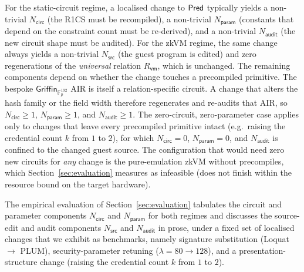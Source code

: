 For the static-circuit regime, a localised change to $\mathsf{Pred}$ typically yields a non-trivial $N_{\mathsf{circ}}$ (the R1CS must be recompiled), a non-trivial $N_{\mathsf{param}}$ (constants that depend on the constraint count must be re-derived), and a non-trivial $N_{\mathsf{audit}}$ (the new circuit shape must be audited).
For the zkVM regime, the same change always yields a non-trivial $N_{\mathsf{src}}$ (the guest program is edited) and zero regenerations of the \emph{universal} relation $R_{\mathsf{vm}}$, which is unchanged. The remaining components depend on whether the change touches a precompiled primitive. The bespoke $\mathsf{Griffin}_{\mathbb{F}_p^{192}}$ AIR is itself a relation-specific circuit. A change that alters the hash family or the field width therefore regenerates and re-audits that AIR, so $N_{\mathsf{circ}}\ge 1$, $N_{\mathsf{param}}\ge 1$, and $N_{\mathsf{audit}}\ge 1$. The zero-circuit, zero-parameter case applies only to changes that leave every precompiled primitive intact (e.g.\ raising the credential count $k$ from $1$ to $2$), for which $N_{\mathsf{circ}}=0$, $N_{\mathsf{param}}=0$, and $N_{\mathsf{audit}}$ is confined to the changed guest source. The configuration that would need zero new circuits for \emph{any} change is the pure-emulation zkVM without precompiles, which Section~\ref{sec:evaluation} measures as infeasible (does not finish within the resource bound on the target hardware).

The empirical evaluation of Section~\ref{sec:evaluation} tabulates the circuit and parameter components $N_{\mathsf{circ}}$ and $N_{\mathsf{param}}$ for both regimes and discusses the source-edit and audit components $N_{\mathsf{src}}$ and $N_{\mathsf{audit}}$ in prose, under a fixed set of localised changes that we exhibit as benchmarks, namely signature substitution (Loquat $\to$ PLUM), security-parameter retuning ($\lambda=80\to128$), and a presentation-structure change (raising the credential count $k$ from $1$ to $2$).

